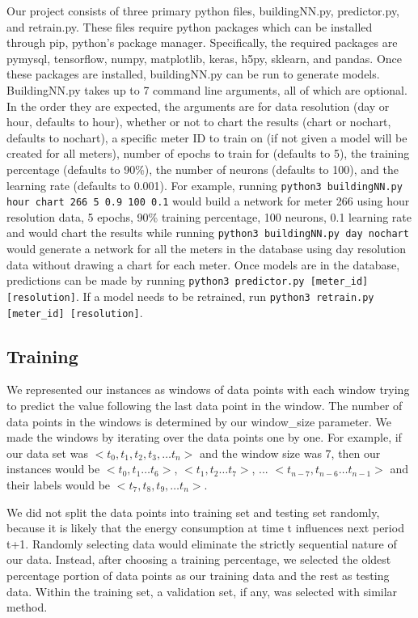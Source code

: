\documentclass[letterpaper, 11 pt, conference]{ieeeconf}  %
\begin{document}
Our project consists of three primary python files, buildingNN.py, predictor.py, and retrain.py. These files require python packages which can be installed through pip, python’s package manager. Specifically, the required packages are pymysql, tensorflow, numpy, matplotlib, keras, h5py, sklearn, and pandas. Once these packages are installed, buildingNN.py can be run to generate models. BuildingNN.py takes up to 7 command line arguments, all of which are optional. In the order they are expected, the arguments are for data resolution (day or hour, defaults to hour), whether or not to chart the results (chart or nochart, defaults to nochart), a specific meter ID to train on (if not given a model will be created for all meters), number of epochs to train for (defaults to 5), the training percentage (defaults to 90\%), the number of neurons (defaults to 100), and the learning rate (defaults to 0.001). For example, running \texttt{python3 buildingNN.py hour chart 266 5 0.9 100 0.1} would build a network for meter 266 using hour resolution data, 5 epochs, 90\% training percentage, 100 neurons, 0.1 learning rate and would chart the results while running \texttt{python3 buildingNN.py day nochart} would generate a network for all the meters in the database using day resolution data without drawing a chart for each meter. Once models are in the database, predictions can be made by running \texttt{python3 predictor.py [meter\_id] [resolution]}. If a model needs to be retrained, run \texttt{python3 retrain.py [meter\_id] [resolution]}.

\subsection{Training}

We represented our instances as windows of data points with each window trying to predict the value following the last data point in the window. The number of data points in the windows is determined by our window\_size parameter. We made the windows by iterating over the data points one by one. For example, if our data set was  $<t_0, t_1, t_2, t_3, \ldots t_n>$ and the window size was 7, then our instances would be $<t_0, t_1 \ldots t_6>$, $<t_1, t_2 \ldots t_7>$, ... $<t_{n-7}, t_{n-6} \ldots t_{n-1}>$ and their labels would be $<t_7, t_8, t_9, \ldots t_n>$. 

We did not split the data points into training set and testing set randomly, because it is likely that the energy consumption at time t influences next period t+1. Randomly selecting data would eliminate the strictly sequential nature of our data. Instead, after choosing a training percentage, we selected the oldest percentage portion of data points as our training data and the rest as testing data. Within the training set, a validation set, if any, was selected with similar method. 
\end{document}
